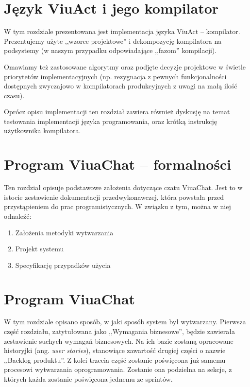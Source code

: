 \documentclass[11pt,oneside,a4paper,titlepage,onecolumn]{book}
\begin{document}
\section{Język ViuAct i jego kompilator}

W tym rozdziale prezentowana jest implementacja języka ViuAct -- kompilator. Prezentujemy użyte ,,wzorce
projektowe'' i dekompozycję kompilatora na podsystemy (w naszym przypadku odpowiadające ,,fazom'' kompilacji).

Omawiamy też zastosowane algorytmy oraz podjęte decyzje projektowe w świetle priorytetów implementacyjnych
(np. rezygnacja z pewnych funkcjonalności dostępnych zwyczajowo w kompilatorach produkcyjnych z uwagi na małą
ilość czasu).

Oprócz opisu implementacji ten rozdział zawiera również dyskusję na temat testowania implementacji języka
programowania, oraz krótką instrukcję użytkownika kompilatora.


\section{Program ViuaChat -- formalności}

Ten rozdział opisuje podstawowe założenia dotyczące
czatu ViuaChat. Jest to w istocie zestawienie dokumentacji przedwykonawczej, która powstała przed przystąpieniem do prac programistycznych. W związku z tym, można w niej odnaleźć:
\begin{enumerate}
  \item Założenia metodyki wytwarzania
  \item Projekt systemu
  \item Specyfikację przypadków użycia
\end{enumerate}

\section{Program ViuaChat}

W tym rozdziale opisano sposób, w jaki sposób system był wytwarzany. Pierwsza część rozdziału, zatytułowana jako ,,Wymagania biznesowe'', będzie zawierała zestawienie suchych wymagań biznesowych. Na ich bazie zostaną opracowane historyjki (ang. \textit{user stories}), stanowiące zawartość drugiej części o nazwie ,,Backlog produktu''. Z kolei trzecia część zostanie poświęcona już samemu procesowi wytwarzania oprogramowania. Zostanie ona podzielna na sekcje, z których każda zostanie poświęcona jednemu ze sprintów.
\end{document}
